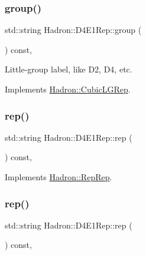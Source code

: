 \subsubsection{\texorpdfstring{group()}{group()}\hspace{0.1cm}{\footnotesize\ttfamily [3/3]}}
{\footnotesize\ttfamily std\+::string Hadron\+::\+D4\+E1\+Rep\+::group (\begin{DoxyParamCaption}{ }\end{DoxyParamCaption}) const\hspace{0.3cm}{\ttfamily [inline]}, {\ttfamily [virtual]}}

Little-\/group label, like D2, D4, etc. 

Implements \mbox{\hyperlink{structHadron_1_1CubicLGRep_a9bdb14b519a611d21379ed96a3a9eb41}{Hadron\+::\+Cubic\+L\+G\+Rep}}.

\mbox{\label{structHadron_1_1D4E1Rep_add1afe88264c5adac1932f9880a6d980}} 
\subsubsection{\texorpdfstring{rep()}{rep()}\hspace{0.1cm}{\footnotesize\ttfamily [1/3]}}
{\footnotesize\ttfamily std\+::string Hadron\+::\+D4\+E1\+Rep\+::rep (\begin{DoxyParamCaption}{ }\end{DoxyParamCaption}) const\hspace{0.3cm}{\ttfamily [inline]}, {\ttfamily [virtual]}}



Implements \mbox{\hyperlink{structHadron_1_1RepRep_ab3213025f6de249f7095892109575fde}{Hadron\+::\+Rep\+Rep}}.

\mbox{\label{structHadron_1_1D4E1Rep_add1afe88264c5adac1932f9880a6d980}} 
\subsubsection{\texorpdfstring{rep()}{rep()}\hspace{0.1cm}{\footnotesize\ttfamily [2/3]}}
{\footnotesize\ttfamily std\+::string Hadron\+::\+D4\+E1\+Rep\+::rep (\begin{DoxyParamCaption}{ }\end{DoxyParamCaption}) const\hspace{0.3cm}{\ttfamily [inline]}, {\ttfamily [virtual]}}



